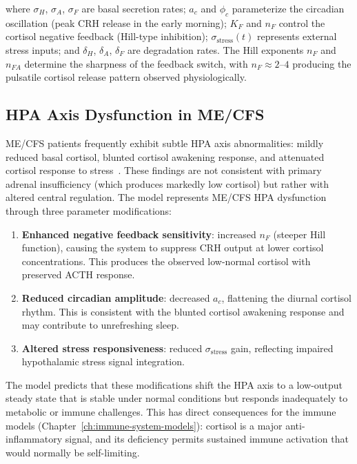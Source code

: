where $\sigma_H$, $\sigma_A$, $\sigma_F$ are basal secretion rates; $a_c$ and $\phi_c$ parameterize the circadian oscillation (peak CRH release in the early morning); $K_F$ and $n_F$ control the cortisol negative feedback (Hill-type inhibition); $\sigma_{\text{stress}}(t)$ represents external stress inputs; and $\delta_H$, $\delta_A$, $\delta_F$ are degradation rates. The Hill exponents $n_F$ and $n_{FA}$ determine the sharpness of the feedback switch, with $n_F \approx 2$--$4$ producing the pulsatile cortisol release pattern observed physiologically.

\subsection{HPA Axis Dysfunction in ME/CFS}
\label{sec:hpa-dysfunction-model}

ME/CFS patients frequently exhibit subtle HPA axis abnormalities: mildly reduced basal cortisol, blunted cortisol awakening response, and attenuated cortisol response to stress~\cite{Cleare1999}. These findings are not consistent with primary adrenal insufficiency (which produces markedly low cortisol) but rather with altered central regulation. The model represents ME/CFS HPA dysfunction through three parameter modifications:

\begin{enumerate}
    \item \textbf{Enhanced negative feedback sensitivity}: increased $n_F$ (steeper Hill function), causing the system to suppress CRH output at lower cortisol concentrations. This produces the observed low-normal cortisol with preserved ACTH response.
    \item \textbf{Reduced circadian amplitude}: decreased $a_c$, flattening the diurnal cortisol rhythm. This is consistent with the blunted cortisol awakening response and may contribute to unrefreshing sleep.
    \item \textbf{Altered stress responsiveness}: reduced $\sigma_{\text{stress}}$ gain, reflecting impaired hypothalamic stress signal integration.
\end{enumerate}

The model predicts that these modifications shift the HPA axis to a low-output steady state that is stable under normal conditions but responds inadequately to metabolic or immune challenges. This has direct consequences for the immune models (Chapter~\ref{ch:immune-system-models}): cortisol is a major anti-inflammatory signal, and its deficiency permits sustained immune activation that would normally be self-limiting.

